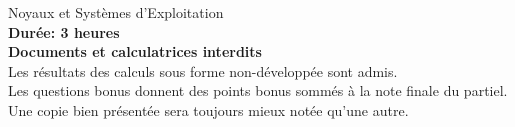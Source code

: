 %
%
%
%
%
%
%

%
%

\def\path{../../..}

%
%



\newcommand{\class}{NSE}
\newcommand{\examdate}{2014}
\newcommand{\timelimit}{3h}
\newcommand{\school}{EPITA}

%
%


%
%

\begin{center}
  {\LARGE Noyaux et Systèmes d'Exploitation}\\
  \vspace{1cm}
  \textbf{Durée: 3 heures}\\
  \textbf{Documents et calculatrices interdits}\\
  \scriptsize{Les résultats des calculs sous forme non-développée sont admis.}\\
  \scriptsize{Les questions bonus donnent des points bonus sommés à la note finale du partiel.}\\
  \scriptsize{Une copie bien présentée sera toujours mieux notée qu'une autre.}
\end{center}
\vspace{1cm}

%
%

